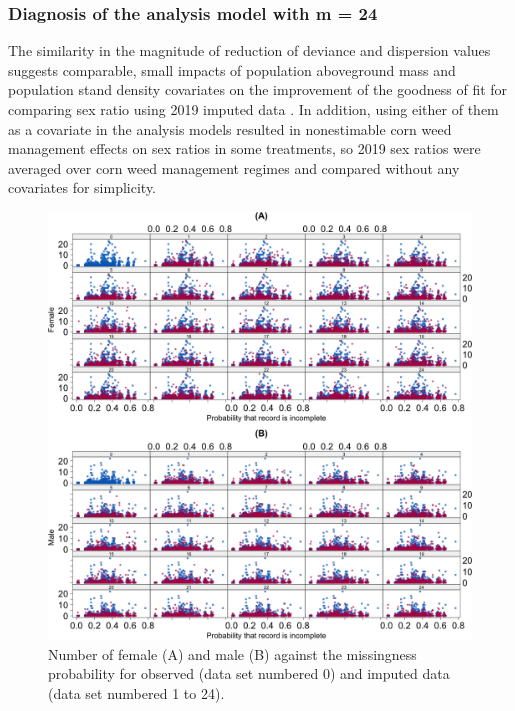 \documentclass[
]{article}
\begin{document}
\hypertarget{diagnosis-of-the-analysis-model-with-m-24}{%
\subsubsection*{Diagnosis of the analysis model with m = 24}\label{diagnosis-of-the-analysis-model-with-m-24}}

The similarity in the magnitude of reduction of deviance and dispersion values suggests comparable, small impacts of population aboveground mass and population stand density covariates on the improvement of the goodness of fit for comparing sex ratio using 2019 imputed data \citep{nguyenDataImpactCropping2022}. In addition, using either of them as a covariate in the analysis models resulted in nonestimable corn weed management effects on sex ratios in some treatments, so 2019 sex ratios were averaged over corn weed management regimes and compared without any covariates for simplicity.

\begin{figure}[H]
\includegraphics[width=1\linewidth]{sex-19-imputation-jan29-22_files/figure-latex/kernel-xy-imp1-all-diag-1} \caption{Number of female (A) and male (B) against the missingness probability for observed (data set numbered 0) and imputed data (data set numbered 1 to 24).}\label{fig:kernel-xy-imp1-all-diag}
\end{figure}
\end{document}
